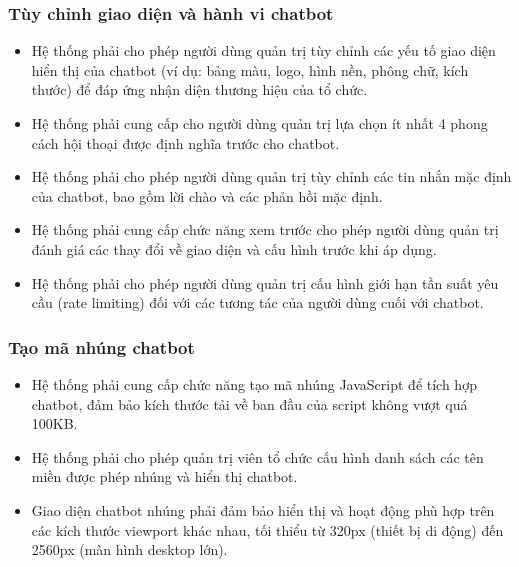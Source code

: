 \subsubsection{Tùy chỉnh giao diện và hành vi chatbot}
\begin{itemize}
    \item Hệ thống phải cho phép người dùng quản trị tùy chỉnh các yếu tố giao diện hiển thị của chatbot (ví dụ: bảng màu, logo, hình nền, phông chữ, kích thước) để đáp ứng nhận diện thương hiệu của tổ chức.
    \item Hệ thống phải cung cấp cho người dùng quản trị lựa chọn ít nhất 4 phong cách hội thoại được định nghĩa trước cho chatbot.
    \item Hệ thống phải cho phép người dùng quản trị tùy chỉnh các tin nhắn mặc định của chatbot, bao gồm lời chào và các phản hồi mặc định.
    \item Hệ thống phải cung cấp chức năng xem trước cho phép người dùng quản trị đánh giá các thay đổi về giao diện và cấu hình trước khi áp dụng.
    \item Hệ thống phải cho phép người dùng quản trị cấu hình giới hạn tần suất yêu cầu (rate limiting) đối với các tương tác của người dùng cuối với chatbot.
\end{itemize}
\subsubsection{Tạo mã nhúng chatbot}
\begin{itemize}
    \item Hệ thống phải cung cấp chức năng tạo mã nhúng JavaScript để tích hợp chatbot, đảm bảo kích thước tải về ban đầu của script không vượt quá 100KB.
    \item Hệ thống phải cho phép quản trị viên tổ chức cấu hình danh sách các tên miền được phép nhúng và hiển thị chatbot.
    \item Giao diện chatbot nhúng phải đảm bảo hiển thị và hoạt động phù hợp trên các kích thước viewport khác nhau, tối thiểu từ 320px (thiết bị di động) đến 2560px (màn hình desktop lớn).
\end{itemize}

